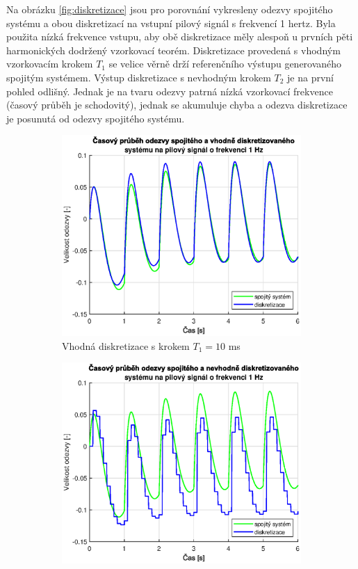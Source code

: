 \documentclass[twoside]{article}
\begin{document}
Na obrázku \ref{fig:diskretizace} jsou pro porovnání vykresleny odezvy spojitého systému a obou diskretizací na vstupní pilový signál s frekvencí 1 hertz.
Byla použita nízká frekvence vstupu, aby obě diskretizace měly alespoň u prvních pěti harmonických dodržený vzorkovací teorém.
Diskretizace provedená s vhodným vzorkovacím krokem $T_1$ se velice věrně drží referenčního výstupu generovaného spojitým systémem.
Výstup diskretizace s nevhodným krokem $T_2$ je na první pohled odlišný. Jednak je na tvaru odezvy patrná nízká vzorkovací frekvence (časový průběh je schodovitý),
jednak se akumuluje chyba a odezva diskretizace je posunutá od odezvy spojitého systému. 
\begin{figure}[htbp]
	\centering
	\begin{subfigure}{0.45\textwidth}	
		\includegraphics[width=\linewidth]{diskretizace-good.eps}
		\caption{Vhodná diskretizace s krokem $T_1 = 10$ ms}
	\end{subfigure}
	\begin{subfigure}{0.45\textwidth}
		\centering
		\includegraphics[width=\linewidth]{diskretizace-bad.eps}

\end{subfigure}
\end{figure}
\end{document}
